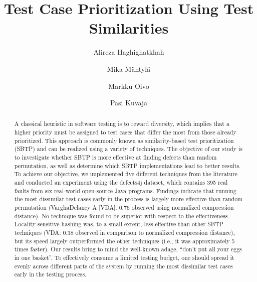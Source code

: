 \documentclass[runningheads]{llncs}
\begin{document}
%
\title{Test Case Prioritization Using Test Similarities}
%
%

\author{
Alireza Haghighatkhah \and Mika M\"{a}ntyl\"{a}\and Markku Oivo \and Pasi Kuvaja 
}


%
%
%
\maketitle              %
%
\begin{abstract}
A classical heuristic in software testing is to reward diversity, which implies that a higher priority must be assigned to test cases that differ the most from those already prioritized. This approach is commonly known as similarity-based test prioritization (SBTP) and can be realized using a variety of techniques. The objective of our study is to investigate whether SBTP is more effective at finding defects than random permutation, as well as determine which SBTP implementations lead to better results. To achieve our objective, we implemented five different techniques from the literature and conducted an experiment using the defects4j dataset, which contains 395 real faults from six real-world open-source Java programs. Findings indicate that running the most dissimilar test cases early in the process is largely more effective than random permutation (Vargha\textendash Delaney A [VDA]: 0.76 observed using normalized compression distance). No technique was found to be superior with respect to the effectiveness. Locality-sensitive hashing was, to a small extent, less effective than other SBTP techniques (VDA: 0.38 observed in comparison to normalized compression distance), but its speed largely outperformed the other techniques (i.e., it was approximately 5 times faster). Our results bring to mind the well-known adage, \enquote{don't put all your eggs in one basket}. To effectively consume a limited testing budget, one should spread it evenly across different parts of the system by running the most dissimilar test cases early in the testing process.


\end{abstract}
%
%
%
\end{document}
